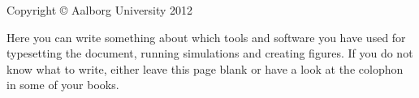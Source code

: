 \thispagestyle{empty}
{\small
\strut\vfill %
\noindent Copyright \copyright{} Aalborg University 2012\par
\vspace{0.2cm}
\noindent Here you can write something about which tools and software you have used for typesetting the document, running simulations and creating figures. If you do not know what to write, either leave this page blank or have a look at the colophon in some of your books.
}
\clearpage

